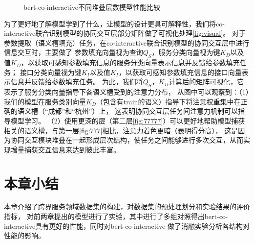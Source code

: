 \begin{figure}[htbp]
{  \label{fig:slotF12}
  }
  \caption{bert-co-interactive不同堆叠层数模型性能比较}
  \label{fig:layerCompare}
  \end{figure}

  为了更好地了解模型学到了什么，让模型的设计更具可解释性，我们将co-interactive联合识别模型的协同交互层部分矩阵做了可视化处理\ref{fig:visual}。
  对于参数提取（语义槽填充）任务，在co-interactive联合识别模型的协同交互层中进行信息交互时，主要做了
  参数填充向量视为查询$Q_S$，服务分类向量视为键$K_D$以及值$K_D$，以获取可感知参数填充信息的服务分类向量表示信息并反馈给参数填充任务；
接口分类向量视为键$K_I$以及值$K_I$，以获取可感知参数填充信息的接口向量表示信息并反馈给参数填充任务。
  为此，我们将$Q_S$，$K_D$计算后的矩阵可视化，它表示了服务分类向量指导下各语义槽受到的注意力分布，
  从图中可以观察到：（1）我们的模型在服务类别向量$K_D$（包含有train的语义）指导下将注意权重集中在正确的语义槽（“成都”和“杭州”）上，
  这表明协同交互层任务间注意力机制可以指导模型学习。
  （2）使用更深的层（第二层\ref{fig:77777}）可以更好地帮助模型捕获相关的语义槽，与第一层\ref{fig:777}相比，注意力着色更暗（表明得分高），
  这是因为协同交互模块堆叠在一起形成层次结构，使任务之间能够进行多次交互，从而实现增量捕获交互信息来达到彼此丰富。


  \section{本章小结}
  本章介绍了跨界服务领域数据集的构建，对数据集的预处理划分和实验结果的评价指标，
对前两章提出的模型进行了实验，其中进行了多组对照得出bert-co-interactive具有更好的性能，同时对bert-co-interactive
做了消融实验分析各结构对性能的影响。